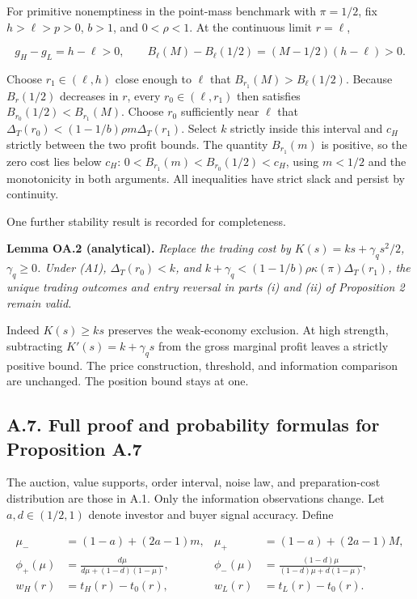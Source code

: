 \documentclass[
  11pt,
]{article}
\newcounter{none} %
\begin{document}
For primitive nonemptiness in the point-mass benchmark with
\(\pi=1/2\), fix \(h>\ell>p>0\), \(b>1\), and
\(0<\rho<1\). At the continuous limit \(r=\ell\),

\[
g_H-g_L=h-\ell>0,\qquad
B_\ell(M)-B_\ell(1/2)=(M-1/2)(h-\ell)>0.
\tag{OA.27}\label{eq:oa-oa-27}
\]

Choose \(r_1\in(\ell,h)\) close enough to \(\ell\) that
\(B_{r_1}(M)>B_\ell(1/2)\). Because \(B_r(1/2)\) decreases in \(r\),
every \(r_0\in(\ell,r_1)\) then satisfies \(B_{r_0}(1/2)<B_{r_1}(M)\).
Choose \(r_0\) sufficiently near \(\ell\) that
\(\Delta_T(r_0)<(1-1/b)\rho m\Delta_T(r_1)\). Select \(k\) strictly
inside this interval and \(c_H\) strictly between the two profit bounds.
The quantity \(B_{r_1}(m)\) is positive, so the zero cost lies below
\(c_H\): \(0<B_{r_1}(m)<B_{r_0}(1/2)<c_H\), using \(m<1/2\) and the monotonicity in
both arguments. All inequalities have strict slack and persist by
continuity.

One further stability result is recorded for completeness.


\protect{}\label{result-lemma-oa-1}{\textbf{Lemma OA.2
(analytical).}} \emph{Replace the trading cost by
\(K(s)=ks+\gamma_qs^2/2\), \(\gamma_q\ge0\). Under (A1),
\(\Delta_T(r_0)<k\), and \(k+\gamma_q<(1-1/b)\rho\kappa(\pi)\Delta_T(r_1)\), the
unique trading outcomes and entry reversal in parts (i) and (ii) of
Proposition 2 remain valid.}

Indeed \(K(s)\ge ks\) preserves the weak-economy exclusion. At high
strength, subtracting \(K'(s)=k+\gamma_qs\) from the gross marginal
profit leaves a strictly positive bound. The price construction,
threshold, and information comparison are unchanged. The position bound
stays at one.

\subsection{A.7. Full proof and probability formulas for Proposition
A.7}\label{oa-a-signals}

The auction, value supports, order interval, noise law, and
preparation-cost distribution are those in A.1. Only the information
observations change. Let \(a,d\in(1/2,1)\) denote investor and buyer
signal accuracy. Define

\[
\begin{aligned}
\mu_-&=(1-a)+(2a-1)m,&\mu_+&=(1-a)+(2a-1)M,\\
\phi_+(\mu)&=\frac{d\mu}{d\mu+(1-d)(1-\mu)},&
\phi_-(\mu)&=\frac{(1-d)\mu}{(1-d)\mu+d(1-\mu)},\\
w_H(r)&=t_H(r)-t_0(r),&w_L(r)&=t_L(r)-t_0(r).
\end{aligned}
\tag{OA.28}\label{eq:oa-oa-28}
\]
\end{document}
